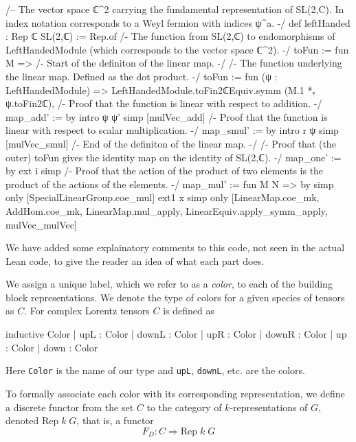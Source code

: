 \documentclass[a4paper, 11pt]{article}
\newcommand{\Rep}[2]{\mathrm{Rep} \; #1 \; #2}
\begin{document}
\begin{codeLong}
/-- The vector space ℂ^2 carrying the fundamental representation of SL(2,C).
  In index notation corresponds to a Weyl fermion with indices ψ^a. -/
def leftHanded : Rep ℂ SL(2,ℂ) := Rep.of {
  /- The function from SL(2,ℂ) to endomorphisms of LeftHandedModule 
    (which corresponds to the vector space ℂ^2). -/
  toFun := fun M => {
    /- Start of the definiton of the linear map. -/
    /- The function underlying the linear map. Defined as the dot product. -/
    toFun := fun (ψ : LeftHandedModule) =>
      LeftHandedModule.toFin2ℂEquiv.symm (M.1 *ᵥ ψ.toFin2ℂ),
    /- Proof that the function is linear with respect to addition. -/
    map_add' := by
      intro ψ ψ'
      simp [mulVec_add]
    /- Proof that the function is linear with respect to scalar multiplication. -/
    map_smul' := by
      intro r ψ
      simp [mulVec_smul]
    /- End of the definiton of the linear map. -/}
  /- Proof that (the outer) toFun gives the identity map on the identity of SL(2,ℂ). -/
  map_one' := by
    ext i
    simp
  /- Proof that the action of the product of two elements is 
    the product of the actions of the elements. -/
  map_mul' := fun M N => by
    simp only [SpecialLinearGroup.coe_mul]
    ext1 x
    simp only [LinearMap.coe_mk, AddHom.coe_mk, LinearMap.mul_apply, LinearEquiv.apply_symm_apply,
      mulVec_mulVec]}
\end{codeLong} 
We have added some explainatory comments to this code, not seen in the actual Lean code, to give 
the reader an idea of what each part does. 

We assign a unique label, which we refer to as a \emph{color}, to each of the 
building block representations. We denote the type of colors for a given species of tensors as $C$.
For complex Lorentz tensors 
$C$ is defined as 
\begin{code}
inductive Color
  | upL : Color
  | downL : Color
  | upR : Color
  | downR : Color
  | up : Color
  | down : Color
\end{code}
Here \lstinline|Color| is the name of our type and \lstinline|upL|, \lstinline|downL|, etc. are the
colors. 

To formally associate each color with its corresponding representation, we define
a discrete functor from the set $C$ to the category of $k$-representations of $G$, denoted 
$\Rep k G$, that is, a functor
\begin{equation} 
  F_{D} : C \Rightarrow \Rep k G
\end{equation}
\end{document}
